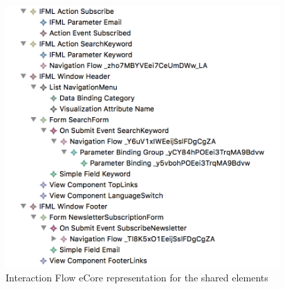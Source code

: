 \vspace{0.5cm}
\begin{figure}[H]
  \centering
    \includegraphics[height=10cm]{images/diagrams/before/ifml-hierarchy-headersearchfooter.png}
  \caption{Interaction Flow eCore representation for the shared elements}
  \label{fig:ifml-before-hierarchy-headersearchfooter}
\end{figure}
\vspace{0.5cm}
